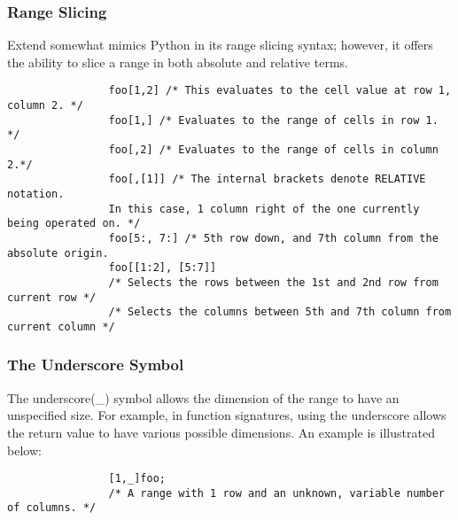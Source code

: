 		\subsubsection{Range Slicing}
			Extend somewhat mimics Python in its range slicing syntax; however, it offers the ability to slice a range in both absolute and relative terms.
			\begin{lstlisting}
				foo[1,2] /* This evaluates to the cell value at row 1, column 2. */
				foo[1,] /* Evaluates to the range of cells in row 1. */
				foo[,2] /* Evaluates to the range of cells in column 2.*/
				foo[,[1]] /* The internal brackets denote RELATIVE notation. 
				In this case, 1 column right of the one currently being operated on. */ 
				foo[5:, 7:] /* 5th row down, and 7th column from the absolute origin.
				foo[[1:2], [5:7]] 
				/* Selects the rows between the 1st and 2nd row from current row */
				/* Selects the columns between 5th and 7th column from current column */
			\end{lstlisting}
		\subsubsection{The Underscore Symbol}
			The underscore(\_) symbol allows the dimension of the range to have an unspecified size. For example, in function signatures, using the underscore allows the return value to have various possible dimensions. An example is illustrated below:
			\begin{lstlisting}
				[1,_]foo; 
				/* A range with 1 row and an unknown, variable number of columns. */
			\end{lstlisting}
